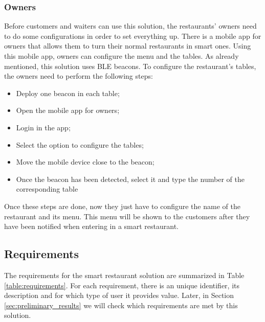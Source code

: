 \subsubsection{Owners}
\label{sub:owners}
Before customers and waiters can use this solution, the restaurants' owners
need to do some configurations in order to set everything up.
There is a mobile app for owners that allows them to turn their normal
restaurants in smart ones.
Using this mobile app, owners can configure the menu and the tables.
As already mentioned, this solution uses BLE beacons. To configure
the restaurant's tables, the owners need to perform the following steps:
\begin{itemize}
  \item Deploy one beacon in each table;
  \item Open the mobile app for owners;
  \item Login in the app;
  \item Select the option to configure the tables;
  \item Move the mobile device close to the beacon;
  \item Once the beacon has been detected, select it and type the number
  of the corresponding table
\end{itemize}
Once these steps are done, now they just have to configure the name of the
restaurant and its menu. This menu will be shown to the customers after they
have been notified when entering in a smart restaurant.

\subsection{Requirements}
\label{sub:requirements}
The requirements for the smart restaurant solution are summarized in Table
\ref{table:requirements}.
For each requirement, there is an unique
identifier, its description and for which type of user it provides value.
Later, in Section \ref{sec:preliminary_results} we will check which
requirements are met by this solution.

